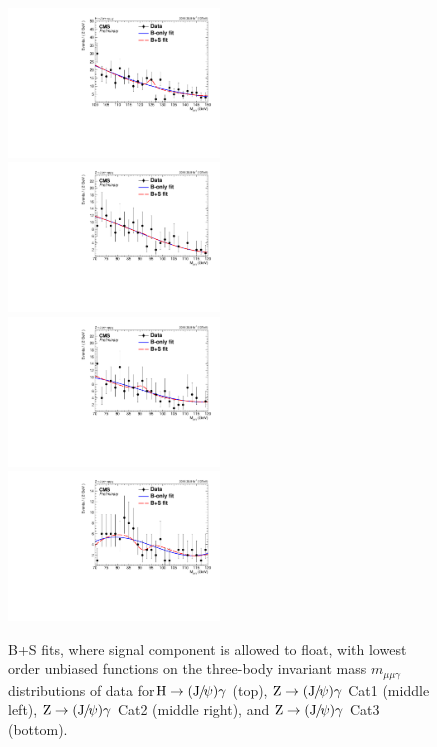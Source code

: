 		\begin{figure}[p]
		    \centering
		    \includegraphics[width=0.5\textwidth]{Fig/Fit/SBFit_notfix/BkgSigFit_HJpsiG_Inclusive_Bernstein2}\\
		    \includegraphics[width=0.5\textwidth]{Fig/Fit/SBFit_notfix/BkgSigFit_ZJpsiG_EBHR9_Bernstein3}~
		    \includegraphics[width=0.5\textwidth]{Fig/Fit/SBFit_notfix/BkgSigFit_ZJpsiG_EBLR9_Bernstein3}\\
		    \includegraphics[width=0.5\textwidth]{Fig/Fit/SBFit_notfix/BkgSigFit_ZJpsiG_EE_Bernstein3}\\
		    \caption[]{\label{fig:sbfitnotfix}
		     B+S fits, where signal component is allowed to float, with lowest order unbiased functions on the three-body invariant mass $m_{\mu\mu\gamma}$ distributions of data for$\mathrm{H}\to ({\mathrm{J}\hspace{-.08em}/\hspace{-.14em}\psi})\gamma$ (top), $\mathrm{Z}\to ({\mathrm{J}\hspace{-.08em}/\hspace{-.14em}\psi})\gamma$ Cat1 (middle left), $\mathrm{Z}\to ({\mathrm{J}\hspace{-.08em}/\hspace{-.14em}\psi})\gamma$ Cat2 (middle right), and $\mathrm{Z}\to ({\mathrm{J}\hspace{-.08em}/\hspace{-.14em}\psi})\gamma$ Cat3 (bottom).}
		\end{figure}
		
